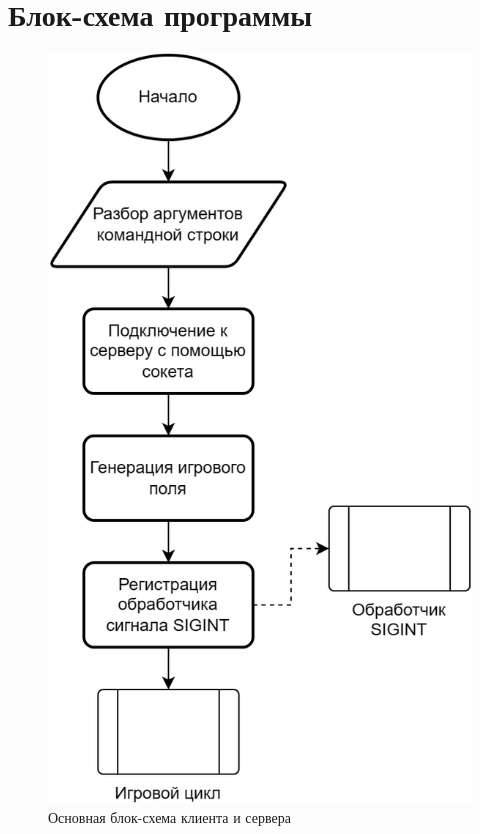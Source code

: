 \newpage

\section*{Блок-схема программы}

\begin{figure}[H]
    \centering
    \includegraphics[width=0.5\linewidth]{images/lab3_flowchart.drawio.png}
    \caption{Основная блок-схема клиента и сервера}
    \label{fig:flowchart}
\end{figure}

